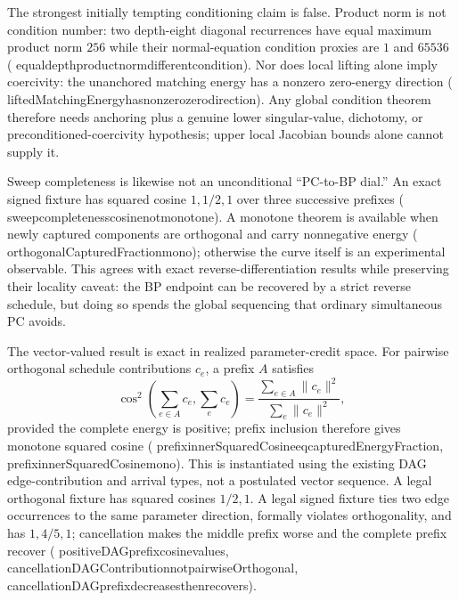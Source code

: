 \documentclass[11pt]{article}
\newcommand{\leanname}[1]{{\scriptsize\ttfamily
  \def\_{\textunderscore\allowbreak}#1}}
\begin{document}
The strongest initially tempting conditioning claim is false. Product norm is not
condition number: two depth-eight diagonal recurrences have equal maximum product norm
$256$ while their normal-equation condition proxies are $1$ and $65536$
(\leanname{equal\_depth\_product\_norm\_different\_condition}). Nor does local lifting
alone imply coercivity: the unanchored matching energy has a nonzero zero-energy
direction (\leanname{liftedMatchingEnergy\_has\_nonzero\_zero\_direction}). Any global
condition theorem therefore needs anchoring plus a genuine lower singular-value,
dichotomy, or preconditioned-coercivity hypothesis; upper local Jacobian bounds alone
cannot supply it.

Sweep completeness is likewise not an unconditional ``PC-to-BP dial.'' An exact signed
fixture has squared cosine $1,1/2,1$ over three successive prefixes
(\leanname{sweep\_completeness\_cosine\_not\_monotone}). A monotone theorem is available
when newly captured components are orthogonal and carry nonnegative energy
(\leanname{orthogonalCapturedFraction\_mono}); otherwise the curve itself is an
experimental observable. This agrees with exact reverse-differentiation results while
preserving their locality caveat: the BP endpoint can be recovered by a strict reverse
schedule, but doing so spends the global sequencing that ordinary simultaneous PC avoids.

The vector-valued result is exact in realized parameter-credit space.  For pairwise
orthogonal schedule contributions $c_e$, a prefix $A$ satisfies
\[
 \cos^2\!\left(\sum_{e\in A}c_e,\sum_e c_e\right)
 =\frac{\sum_{e\in A}\lVert c_e\rVert^2}{\sum_e\lVert c_e\rVert^2},
\]
provided the complete energy is positive; prefix inclusion therefore gives monotone
squared cosine
(\leanname{prefix\_innerSquaredCosine\_eq\_capturedEnergyFraction},
\leanname{prefix\_innerSquaredCosine\_mono}).  This is instantiated using the existing
DAG edge-contribution and arrival types, not a postulated vector sequence.  A legal
orthogonal fixture has squared cosines $1/2,1$.  A legal signed fixture ties two edge
occurrences to the same parameter direction, formally violates orthogonality, and has
$1,4/5,1$; cancellation makes the middle prefix worse and the complete prefix recover
(\leanname{positiveDAG\_prefix\_cosine\_values},
\leanname{cancellationDAGContribution\_not\_pairwiseOrthogonal},
\leanname{cancellationDAG\_prefix\_decreases\_then\_recovers}).
\end{document}
